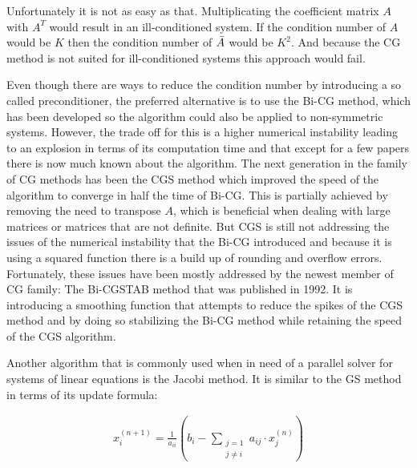 Unfortunately it is not as easy as that. Multiplicating the coefficient matrix $A$ with $A^T$ would result in an ill-conditioned system. If the condition number of $A$ would be $K$ then the condition number of $\Bar{A}$ would be $K^2$. And because the \acl{CG} method is not suited for ill-conditioned systems this approach would fail. 

Even though there are ways to reduce the condition number by introducing a so called preconditioner, the preferred alternative is to use the \acl{Bi-CG} method, which has been developed so the algorithm could also be applied to non-symmetric systems.\textsuperscript{\cite[p.~19]{Rambo2016TheEquations}} However, the trade off for this is a higher numerical instability leading to an explosion in terms of its computation time and that except for a few papers there is now much known about the algorithm.\textsuperscript{\cite[p.~16]{Rambo2016TheEquations}} The next generation in the family of \acs{CG} methods has been the \acl{CGS} method which improved the speed of the algorithm to converge in half the time of \acs{Bi-CG}. This is partially achieved by removing the need to transpose $A$, which is beneficial when dealing with large matrices  or matrices that are not definite. But \acs{CGS} is still not addressing the issues of the numerical instability that the \acl{Bi-CG} introduced and because it is using a squared function there is a build up of rounding and overflow errors.\textsuperscript{\cite[p.~19]{Vinay2016UnderstandingBi-CGSTAB}} Fortunately, these issues have been mostly addressed by the newest member of \acs{CG} family: The \acl{Bi-CGSTAB} method that was published in 1992. It is introducing a smoothing function that attempts to reduce the spikes of the \acs{CGS} method and by doing so stabilizing the \acs{Bi-CG} method while retaining the speed of the \acs{CGS} algorithm.\textsuperscript{\cite[p.~19]{Vinay2016UnderstandingBi-CGSTAB}}

Another algorithm that is commonly used when in need of a parallel solver for systems of linear equations is the Jacobi method. It is similar to the \acl{GS} method in terms of its update formula:

\begin{equation}\label{eq:jacobi_update}
	\begin{array}{lrcl}
		x_i^{(n+1)}  = \frac{1}{a_{ii}} (b_i - \displaystyle\sum_{\substack{j=1 \\ j\neq i}} a_{ij} \cdot x_j^{(n)})
	\end{array}
\end{equation}

